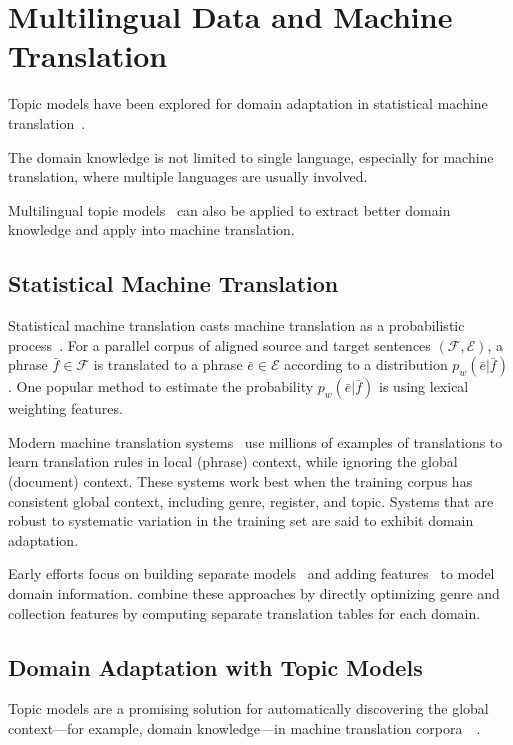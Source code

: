 \chapter{Multilingual Data and Machine Translation}
\label{ch:mt}

Topic models have been explored for domain adaptation in statistical machine translation~\citep{Eidelman-12,hu-14}.

The domain knowledge is not limited to single language, especially for machine translation, where multiple languages are usually involved.

Multilingual topic models~\citep{mimno-09,boyd-graber-10} can also be applied to extract better domain knowledge and apply into machine translation.

\section{Statistical Machine Translation}

Statistical machine translation casts machine translation as a probabilistic process~\citep{koehn-09}. For a parallel corpus of aligned source and target sentences $(\mathcal{F}, \mathcal{E})$, a phrase $\bar{f} \in \mathcal{F}$ is translated to a phrase $\bar{e} \in \mathcal{E}$ according to a distribution $p_w(\bar{e}|\bar{f})$.
One popular method to estimate the probability $p_w(\bar{e}|\bar{f})$ is using lexical weighting features.

Modern machine translation systems~\citep{koehn-09} use millions of examples of translations to learn translation rules in local (phrase) context, while ignoring the global (document) context. These systems work best when the training corpus has consistent global context, including genre, register, and topic. Systems that are robust to systematic variation in the training set are said to exhibit domain adaptation.

Early efforts focus on building separate models~\citep{foster-07} and adding features~\citep{matsoukas-09} to model domain information.  \citet{chiang-11} combine these approaches by directly optimizing genre and collection features by computing separate translation tables for each domain.

\section{Domain Adaptation with Topic Models}

Topic models are a promising solution for automatically discovering the global context---for example, domain knowledge---in machine translation corpora~~\citep{Eidelman-12,hu-14}.

